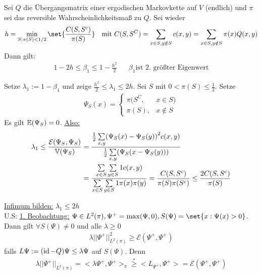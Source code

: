 \begin{satz}
	Sei $Q$ die Übergangsmatrix einer ergodischen Markovkette auf $V$ (endlich) und $\pi$ sei das reversible Wahrscheinlichkeitsmaß zu $Q$. Sei wieder 
	\begin{align}
		h = \min\limits_{S:\pi(S)<1/2} \set{\frac{C(S,S^c)}{\pi(S)}} && \text{mit } C(S,S^C) = \sum\limits_{x \in S, y \notin S} c(x,y) = \sum\limits_{x \in S, y \notin S} \pi(x) Q(x,y)
	\end{align}
	Dann gilt:
	\begin{align}
		1-2h \leq \beta_1 \leq 1-\frac{h^2}{2} && \beta_1 \text{ist 2. größter Eigenwert}
	\end{align}
\end{satz}
\begin{beweis}
	Setze $\lambda_1 := 1 - \beta_1$ und zeige $\frac{h^2}{2} \leq \lambda_1 \leq 2h$. Sei $S$ mit $0 < \pi(S) \leq \frac{1}{2}$. Setze
	\begin{align}
		\Psi_S(x) = \begin{cases}
						\pi(S^C, & x\in S) \\
						\pi(S), & x \notin S
					\end{cases}
	\end{align}
	Es gilt $\EW{\Psi_S} = 0$. \underline{Also:}
	\begin{align}
		\lambda_1 \leq \frac{\mathcal{E}(\Psi_S,\Psi_S)}{\Var{\Psi_S}} &= \frac{\frac{1}{2}\sum\limits_{x,y}\enb{\Psi_S(x) - \Psi_S(y)}^2 c(x,y)}{\frac{1}{2} \sum\limits_{x,y} \enb{\Psi_S(x - \Psi_S(y))}} \\
							&= \frac{\sum\limits_{x\in S} \sum\limits_{y \in S} 1 c(x,y) }{\sum\limits_{x \in S}\sum\limits_{y \in S} 1 \pi(x) \pi(y) } = \frac{C(S,S^c)}{\pi(S) \pi(S^c)} \leq \frac{2C(S,S^c)}{\pi(S)}
	\end{align}

	\underline{Infimum bilden:} $\lambda_1 \leq 2h$ \\
	U.S: \underline{1. Beobachtung:} $\Psi \in L^2(\pi), \Psi^+ = \max(\Psi,0),	S(\Psi) = \set{ x : \Psi (x) > 0 }$. Dann gilt $\forall S(\Psi) \neq 0$ und alle $\lambda \geq 0$
	\begin{align}
		\lambda ||\Psi^+||^2_{L^2(\pi)} \geq \mathcal{E} (\Psi^+,\Psi^+)
	\end{align}
	falls $L\Psi := (\operatorname{id} - Q) \Psi \leq \lambda\Psi$ auf $S(\Psi)$. Denn
	\begin{align}
		\lambda ||\Psi^+||_{L^2(\pi)} = < \lambda\Psi^+, \Psi^+>_{\pi} \overset{*}{\geq} <L_{\Psi^+}, \Psi^+ > = \mathcal{E} (\Psi^+,\Psi^+)
	\end{align}


\end{beweis}
